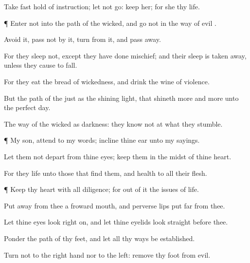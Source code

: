 {Take fast
hold of
instruction; let
{} not
go:
keep her; for she
{} thy
life.


\par }{\PP {}¶
Enter not into the
path of the
wicked, and
go not in the
way of
evil
{}.

Avoid it,
pass not by it,
turn from it, and pass
away.

For they
sleep not, except they have done
mischief; and their
sleep is taken
away, unless they cause
{} to
fall.

For they
eat the
bread of
wickedness, and
drink the
wine of
violence.

But the
path of the
just
{} as the
shining
light, that
shineth
more and more unto the
perfect
day.

The
way of the
wicked
{} as
darkness: they
know not at what they
stumble.


\par }{\PP {}¶ My
son,
attend to my
words;
incline thine
ear unto my
sayings.

Let them not
depart from thine
eyes;
keep them in the
midst of thine
heart.

For they
{}
life unto those that
find them, and
health to all their
flesh.


\par }{\PP {}¶
Keep thy
heart with all
diligence; for out of it
{} the
issues of
life.

Put
away from thee a
froward
mouth, and
perverse
lips put
far from thee.

Let thine
eyes
look right
on, and let thine
eyelids look
straight before thee.

Ponder the
path of thy
feet, and let all thy
ways be
established.

Turn not to the right
hand nor to the
left:
remove thy
foot from
evil.




\par }
